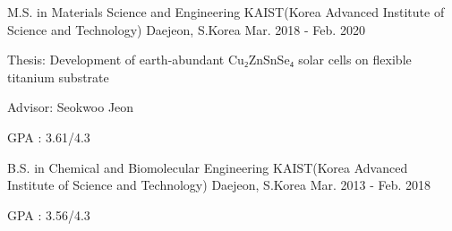 

\begin{cventries}

  \cventry
    {M.S. in Materials Science and Engineering} %
    {KAIST(Korea Advanced Institute of Science and Technology)} %
    {Daejeon, S.Korea} %
    {Mar. 2018 - Feb. 2020} %
    {
      \begin{cvitems} %
        \item {Thesis: Development of earth-abundant Cu₂ZnSnSe₄ solar cells on flexible titanium substrate}      
        \item{Advisor: Seokwoo Jeon}
         \item {GPA : 3.61/4.3}
        \end{cvitems}
    }

     \cventry
    {B.S. in Chemical and Biomolecular Engineering } %
    {KAIST(Korea Advanced Institute of Science and Technology)} %
    {Daejeon, S.Korea} %
    {Mar. 2013 - Feb. 2018} %
        {
      \begin{cvitems} %
        \item {GPA : 3.56/4.3}
      \end{cvitems}
    }

\end{cventries}
